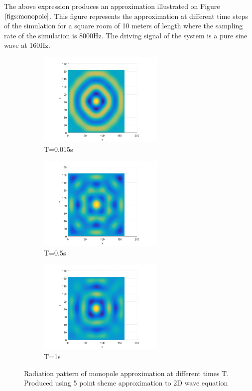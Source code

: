 The above expression produces an approximation illustrated on Figure $\ref{figs:monopole}$. This figure represents the approximation at different time steps of the simulation for a square room of 10 meters of length where the sampling rate of the simulation is 8000Hz. The driving signal of the system is a pure sine wave at 160Hz.
\begin{figure}[h]
\label{figs:monopole}
\begin{subfigure}{0.3 \textwidth}
	\centering
	\includegraphics[width=6cm]{./Chapter_4/_Figs/Monopole001_5point_160Hz_L10m_8000Fs.png}
	\caption{T=0.015s}
\end{subfigure}
\begin{subfigure}{0.3 \textwidth}
	\centering
	\includegraphics[width=6cm]{./Chapter_4/_Figs/Monopole05_5point_160Hz_L10m_8000Fs.png}
	\caption{T=0.5s}
\end{subfigure}
\begin{subfigure}{0.3 \textwidth}
	\centering
	\includegraphics[width=6cm]{./Chapter_4/_Figs/Monopole1_5point_160Hz_L10m_8000Fs.png}
	\caption{T=1s}
\end{subfigure}
\caption{Radiation pattern of monopole approximation at different times T. Produced using 5 point sheme approximation to 2D wave equation}
\end{figure}


